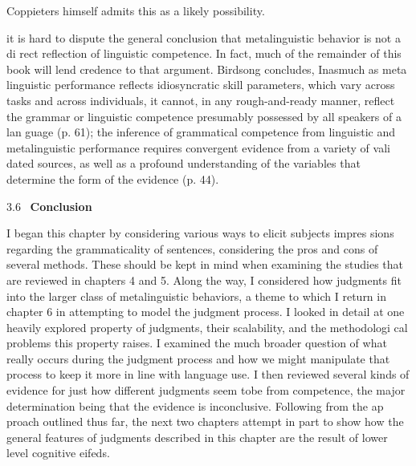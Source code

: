 \begin{listWWNumxlivleveli}
\item 
\begin{styleStandard}
Coppieters himself admits this as a likely possibility.
\end{styleStandard}


\end{listWWNumxlivleveli}
\clearpage\setcounter{page}{1}\begin{styleTextbody}
it is hard to dispute the general conclusion that metalinguistic behavior is not a di\- rect reflection of linguistic competence. In fact, much of the remainder of this book will lend credence to that argument. Birdsong concludes, {\textquotedbl}Inasmuch as meta\- linguistic performance reflects idiosyncratic skill parameters, which vary across tasks and across individuals, it cannot, in any rough-and-ready manner, reflect the grammar or linguistic competence presumably possessed by all speakers of a lan\- guage{\textquotedbl} (p. 61); {\textquotedbl}the inference of grammatical competence from linguistic and metalinguistic performance requires convergent evidence from a variety of vali\- dated sources, as well as a profound understanding of the variables that determine the form of the evidence{\textquotedbl} (p. 44).
\end{styleTextbody}


\begin{styleStandard}
3.6 \ \textbf{Conclusion}
\end{styleStandard}


\begin{styleTextbody}
I began this chapter by considering various ways to elicit subjects{\textquotesingle} impres\- sions regarding the grammaticality of sentences, considering the pros and cons of several methods. These should be kept in mind when examining the studies that are reviewed in chapters 4 and 5. Along the way, I considered how judgments fit into the larger class of metalinguistic behaviors, a theme to which I return in chapter 6 in attempting to model the judgment process. I looked in detail at one heavily explored property of judgments, their scalability, and the methodologi\- cal problems this property raises. I examined the much broader question of what really occurs during the judgment process and how we might manipulate that process to keep it more in line with language use. I then reviewed several kinds of evidence for just how different judgments seem tobe from competence, the major determination being that the evidence is inconclusive. Following from the ap\- proach outlined thus far, the next two chapters attempt in part to show how the general features of judgments described in this chapter are the result of lower\- level cognitive eifeds.
\end{styleTextbody}


